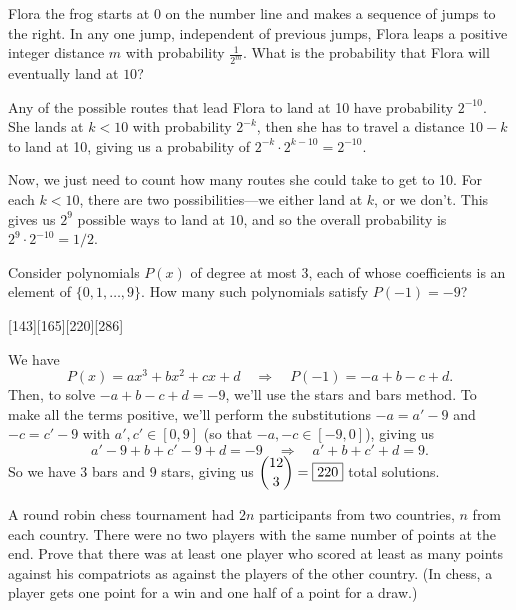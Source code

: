 \begin{problem}[C][3][AMC 12]
    Flora the frog starts at $0$ on the number line and makes a sequence of jumps to the right. In any one jump, independent of previous jumps, Flora leaps a positive integer distance $m$ with probability $\frac{1}{2^m}$. What is the probability that Flora will eventually land at $10$? 
\end{problem}

\begin{solution}[1/2]
    Any of the possible routes that lead Flora to land at 10 have probability $2^{-10}$. She lands at $k<10$ with probability $2^{-k}$, then she has to travel a distance $10-k$ to land at 10, giving us a probability of $2^{-k} \cdot 2^{k-10}=2^{-10}$.
    
    Now, we just need to count how many routes she could take to get to 10. For each $k<10$, there are two possibilities---we either land at $k$, or we don't. This gives us $2^9$ possible ways to land at $10$, and so the overall probability is $2^9 \cdot 2^{-10} = \boxed{1/2}$.
\end{solution}

\begin{problem}[C][4][2018 AMC 12B/22]
    Consider polynomials $P(x)$ of degree at most $3$, each of whose coefficients is an element of $\{0, 1, \ldots, 9\}$. How many such polynomials satisfy $P(-1) = -9$?
\end{problem}
[143][165][220][286]

\begin{solution}[D]
    We have 
    \[ 
        P(x) = ax^3 + bx^2 + cx + d \quad \Rightarrow \quad P(-1) = -a + b - c + d.
    \]
    Then, to solve \( -a + b - c + d = -9 \), we'll use the stars and bars method. To make all the terms positive, we'll perform the substitutions \( -a = a' - 9 \) and \( -c = c' - 9 \) with \( a', c' \in [0,9]\) (so that \(-a, -c \in [-9,0]\)), giving us
    \[
        a' - 9 + b + c' - 9 + d = -9 \quad \Rightarrow \quad a' + b + c' + d = 9.
    \]
    So we have 3 bars and 9 stars, giving us \( \dbinom{12}{3} = \boxed{220} \) total solutions.
\end{solution}

\begin{problem}
    A round robin chess tournament had $2n$ participants from two countries, $n$ from each country. There were no two players with the same number of points at the end. Prove that there was at least one player who scored at least as many points against his compatriots as against the players of the other country. (In chess, a player gets one point for a win and one half of a point for a draw.)
\end{problem}

